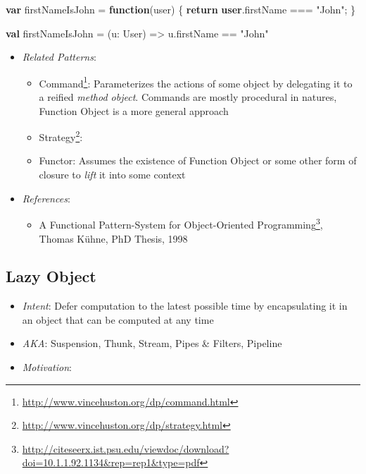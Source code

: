 \documentclass[11pt,]{article}
\newenvironment{Shaded}{}{}
\newcommand{\KeywordTok}[1]{\textcolor[rgb]{0.00,0.44,0.13}{\textbf{{#1}}}}
\newcommand{\StringTok}[1]{\textcolor[rgb]{0.25,0.44,0.63}{{#1}}}
\newcommand{\FunctionTok}[1]{\textcolor[rgb]{0.02,0.16,0.49}{{#1}}}
\newcommand{\NormalTok}[1]{{#1}}
\renewcommand{\href}[2]{#2\footnote{\url{#1}}}
\begin{document}
\begin{Shaded}
\begin{Highlighting}[]
\KeywordTok{var} \NormalTok{firstNameIsJohn = }\KeywordTok{function}\NormalTok{(user) \{ }\KeywordTok{return} \KeywordTok{user}\NormalTok{.}\FunctionTok{firstName} \NormalTok{=== }\StringTok{"John"}\NormalTok{; \}}
\end{Highlighting}
\end{Shaded}

\begin{Shaded}
\begin{Highlighting}[]
\KeywordTok{val} \NormalTok{firstNameIsJohn = (u: User) => u.}\FunctionTok{firstName} \NormalTok{== }\StringTok{"John"}
\end{Highlighting}
\end{Shaded}

\begin{itemize}
\item
  \emph{Related Patterns}:

  \begin{itemize}
  \item
    \href{http://www.vincehuston.org/dp/command.html}{Command}:
    Parameterizes the actions of some object by delegating it to a
    reified \emph{method object}. Commands are mostly procedural in
    natures, Function Object is a more general approach
  \item
    \href{http://www.vincehuston.org/dp/strategy.html}{Strategy}:
  \item
    Functor: Assumes the existence of Function Object or some other form
    of closure to \emph{lift} it into some context
  \end{itemize}
\item
  \emph{References}:

  \begin{itemize}
  \item
    \href{http://citeseerx.ist.psu.edu/viewdoc/download?doi=10.1.1.92.1134\&rep=rep1\&type=pdf}{A
    Functional Pattern-System for Object-Oriented Programming}, Thomas
    Kühne, PhD Thesis, 1998
  \end{itemize}
\end{itemize}

\subsection{Lazy Object}

\begin{itemize}
\item
  \emph{Intent}: Defer computation to the latest possible time by
  encapsulating it in an object that can be computed at any time
\item
  \emph{AKA}: Suspension, Thunk, Stream, Pipes \& Filters, Pipeline
\item
  \emph{Motivation}:
\end{itemize}
\end{document}
